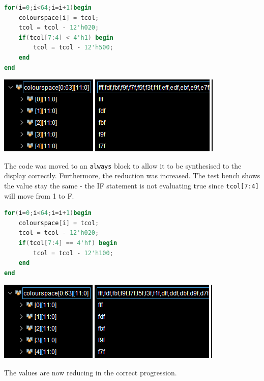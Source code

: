 \begin{minipage}{0.475\linewidth}
\begin{lstlisting}[language=Verilog]
for(i=0;i<64;i=i+1)begin
    colourspace[i] = tcol;
    tcol = tcol - 12'h020;
    if(tcol[7:4] < 4'h1) begin
        tcol = tcol - 12'h500;
    end
end 
\end{lstlisting}
\end{minipage}\hfill
\begin{minipage}{0.5\linewidth}
    \centering
    \includegraphics[width=0.9\linewidth]{figures/tb/5.png}
\end{minipage}
The code was moved to an \lstinline|always| block to allow it to be synthesised to the display correctly. 
Furthermore, the reduction was increased. The test bench shows the value stay the same - the 
IF statement is not evaluating true since \lstinline|tcol[7:4]| will move from 1 to F. 

\begin{minipage}{0.475\linewidth}
\begin{lstlisting}[language=Verilog]
for(i=0;i<64;i=i+1)begin
    colourspace[i] = tcol;
    tcol = tcol - 12'h020;
    if(tcol[7:4] == 4'hf) begin
        tcol = tcol - 12'h100;
    end
end 
\end{lstlisting}
\end{minipage}\hfill
\begin{minipage}{0.5\linewidth}
    \centering
    \includegraphics[width=0.9\linewidth]{figures/tb/6.png}
\end{minipage}
The values are now reducing in the correct progression. 